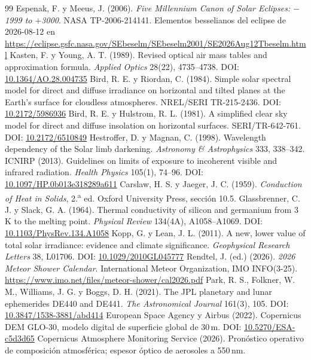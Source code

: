 \documentclass[10pt,a4paper]{article}
\newcommand{\doi}[1]{DOI: \href{https://doi.org/#1}{#1}}
\begin{document}
\begin{thebibliography}{99}
 Espenak, F. y Meeus, J. (2006). \emph{Five Millennium
Canon of Solar Eclipses: $-$1999 to $+$3000}. NASA TP-2006-214141. Elementos
besselianos del eclipse de 2026-08-12 en
\url{https://eclipse.gsfc.nasa.gov/SEbeselm/SEbeselm2001/SE2026Aug12Tbeselm.html}
 Kasten, F. y Young, A. T. (1989). Revised optical air
mass tables and approximation formula. \emph{Applied Optics} 28(22), 4735--4738.
\doi{10.1364/AO.28.004735}
 Bird, R. E. y Riordan, C. (1984). Simple solar
spectral model for direct and diffuse irradiance on horizontal and tilted planes
at the Earth's surface for cloudless atmospheres. NREL/SERI TR-215-2436.
\doi{10.2172/5986936}
 Bird, R. E. y Hulstrom, R. L. (1981). A simplified
clear sky model for direct and diffuse insolation on horizontal surfaces.
SERI/TR-642-761. \doi{10.2172/6510849}
 Hestroffer, D. y Magnan, C. (1998). Wavelength
dependency of the Solar limb darkening. \emph{Astronomy \& Astrophysics} 333,
338--342.
 ICNIRP (2013). Guidelines on limits of exposure to
incoherent visible and infrared radiation. \emph{Health Physics} 105(1), 74--96.
\doi{10.1097/HP.0b013e318289a611}
 Carslaw, H. S. y Jaeger, J. C. (1959). \emph{Conduction
of Heat in Solids}, 2.\textsuperscript{a} ed. Oxford University Press,
sección 10.5.
 Glassbrenner, C. J. y Slack, G. A. (1964). Thermal
conductivity of silicon and germanium from 3\,K to the melting point.
\emph{Physical Review} 134(4A), A1058--A1069. \doi{10.1103/PhysRev.134.A1058}
 Kopp, G. y Lean, J. L. (2011). A new, lower value of
total solar irradiance: evidence and climate significance. \emph{Geophysical
Research Letters} 38, L01706. \doi{10.1029/2010GL045777}
 Rendtel, J. (ed.) (2026). \emph{2026 Meteor Shower Calendar}.
International Meteor Organization, IMO INFO(3-25).
\url{https://www.imo.net/files/meteor-shower/cal2026.pdf}
 Park, R. S., Folkner, W. M., Williams, J. G. y Boggs, D. H.
(2021). The JPL planetary and lunar ephemerides DE440 and DE441.
\emph{The Astronomical Journal} 161(3), 105. \doi{10.3847/1538-3881/abd414}
 European Space Agency y Airbus (2022). Copernicus DEM GLO-30,
modelo digital de superficie global de 30\,m. \doi{10.5270/ESA-c5d3d65}
 Copernicus Atmosphere Monitoring Service (2026). Pronóstico
operativo de composición atmosférica; espesor óptico de aerosoles a 550\,nm.

\end{thebibliography}
\end{document}
